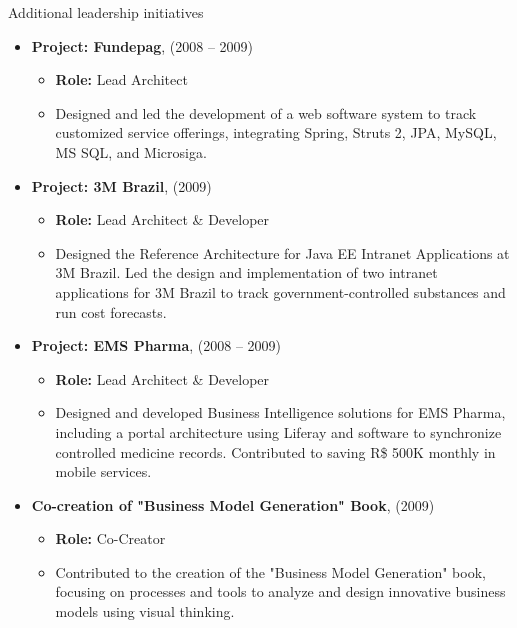\documentclass{resume} %
\begin{document}
\begin{rSection}{Additional leadership initiatives}
\begin{itemize}
    \item \textbf{Project: Fundepag}, \hfill (2008 -- 2009)
    \begin{itemize}
        \item \textbf{Role:} Lead Architect
        \item Designed and led the development of a web software system to track customized service offerings, integrating Spring, Struts 2, JPA, MySQL, MS SQL, and Microsiga.
    \end{itemize}

    \item \textbf{Project: 3M Brazil}, \hfill (2009)
    \begin{itemize}
        \item \textbf{Role:} Lead Architect \& Developer
        \item Designed the Reference Architecture for Java EE Intranet Applications at 3M Brazil. Led the design and implementation of two intranet applications for 3M Brazil to track government-controlled substances and run cost forecasts.
    \end{itemize}

    \item \textbf{Project: EMS Pharma}, \hfill (2008 -- 2009)
    \begin{itemize}
        \item \textbf{Role:} Lead Architect \& Developer
        \item Designed and developed Business Intelligence solutions for EMS Pharma, including a portal architecture using Liferay and software to synchronize controlled medicine records. Contributed to saving R\$ 500K monthly in mobile services.
    \end{itemize}

    \item \textbf{Co-creation of "Business Model Generation" Book}, \hfill  (2009)
    \begin{itemize}
        \item \textbf{Role:} Co-Creator
        \item Contributed to the creation of the "Business Model Generation" book, focusing on processes and tools to analyze and design innovative business models using visual thinking.
    \end{itemize}
\end{itemize}
\end{rSection}

\hfill \break
\end{document}
